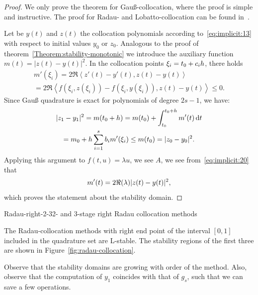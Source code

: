 \begin{proof}
  We only prove the theorem for Gauß-collocation, where the proof is
  simple and instructive. The proof for Radau- and Lobatto-collocation
  can be found in~\cite{HairerWanner10}.

  Let be $y(t)$ and $z(t)$ the collocation polynomials according
  to~\eqref{eq:implicit:13} with respect to initial values $y_0$ or
  $z_0$. Analogous to the proof of
  theorem~\ref{Theorem:stability-monotonic} we introduce the auxiliary
  function $m(t) = | z(t)-y(t)|^2$. In the collocation points
  $\xi_i = t_0 + c_i h$, there holds
  \begin{multline}
    \label{eq:implicit:20}
    m'(\xi_i) = 2 \Re\left<
      z'(t)-y'(t),z(t)-y(t)\right>
    \\
    = 2 \Re\left<f(\xi_i,z(\xi_i)) -
      f(\xi_i,y(\xi_i)),z(t)-y(t)\right> \le 0. 
  \end{multline}
  Since Gauß quadrature is exact for polynomials of degree $2s-1$, we have:
  \begin{multline*}
    |z_1-y_1|^2 = m(t_0+h) = m(t_0) + \int_{t_0}^{t_0+h} m'(t)\,\mathrm{d} t
    \\
    = m_0+h \sum_{i=1}^s b_i m'(\xi_i) \le m(t_0) =  |z_0-y_0|^2.
  \end{multline*}
  Applying this argument to $f(t,u) = \lambda u$, we see 
  $A$, we see from~\eqref{eq:implicit:20} that
  \begin{gather*}
    m'(t) = 2\Re(\lambda) \lvert z(t)-y(t)\rvert^2,
  \end{gather*}
  which proves the statement about the stability domain.
\end{proof}

\begin{Example*}{Radau-right-2-3}{2- and 3-stage right Radau collocation methods}
  \mbox{} 
  \begin{minipage}[t]{.25\linewidth}
    
  \end{minipage}
  \begin{minipage}[t]{.58\linewidth}
          
  \end{minipage}
\end{Example*}

\begin{remark}
  The Radau-collocation methods with right end point of the interval
  $[0,1]$ included in the quadrature set are L-stable. The stability
  regions of the first three are shown in
  Figure~\ref{fig:radau-collocation}.

  Observe that the stability domains are growing with order of the
  method. Also, observe that the computation of $y_1$ coincides with
  that of $g_s$, such that we can save a few operations.
\end{remark}

